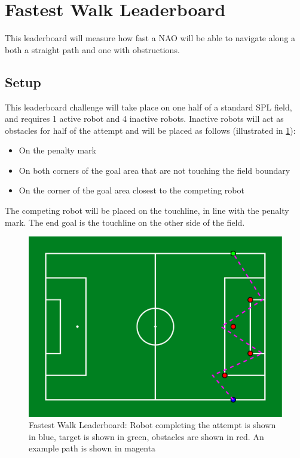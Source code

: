 
\section{Fastest Walk Leaderboard}
This leaderboard will measure how fast a NAO will be able to navigate along a both a straight path and one with obstructions.

\subsection{Setup}
This leaderboard challenge will take place on one half of a standard SPL field, and requires 1 active robot and 4 inactive robots.
Inactive robots will act as obstacles for half of the attempt and will be placed as follows (illustrated in \cref{fig:walk_leaderboard}):
\begin{itemize}
    \item On the penalty mark
    \item On both corners of the goal area that are not touching the field boundary
    \item On the corner of the goal area closest to the competing robot
\end{itemize}

The competing robot will be placed on the touchline, in line with the penalty mark.
The end goal is the touchline on the other side of the field.

\begin{figure}[t]
    \centerline{\includegraphics[width=\columnwidth]{figs/walk_leaderboard.pdf}}
    \caption{Fastest Walk Leaderboard: Robot completing the attempt is shown in blue, target is shown in green, obstacles are shown in red. An example path is shown in magenta}
    \label{fig:walk_leaderboard}
\end{figure}

